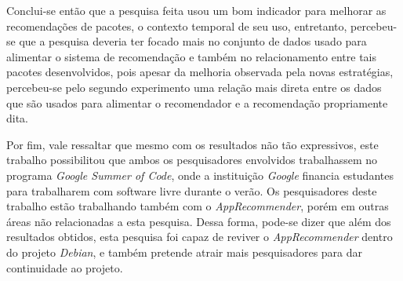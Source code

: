 Conclui-se então que a pesquisa feita usou um bom indicador para melhorar as
recomendações de pacotes, o contexto temporal de seu uso, entretanto,
percebeu-se que a pesquisa deveria ter focado mais no conjunto de dados usado
para alimentar o sistema de recomendação e também no relacionamento entre tais
pacotes desenvolvidos, pois apesar da melhoria observada pela novas estratégias,
percebeu-se pelo segundo experimento uma relação mais direta entre os dados que
são usados para alimentar o recomendador e a recomendação propriamente dita.

Por fim, vale ressaltar que mesmo com os resultados não tão expressivos, este
trabalho possibilitou que ambos os pesquisadores envolvidos trabalhassem no
programa \textit{Google Summer of Code}, onde a instituição \textit{Google}
financia estudantes para trabalharem com software livre durante o verão. Os
pesquisadores deste trabalho estão trabalhando também com o
\textit{AppRecommender}, porém em outras áreas não relacionadas a esta pesquisa.
Dessa forma, pode-se dizer que além dos resultados obtidos, esta pesquisa foi
capaz de reviver o \textit{AppRecommender} dentro do projeto \textit{Debian},
e também pretende atrair mais pesquisadores para dar continuidade ao projeto.
